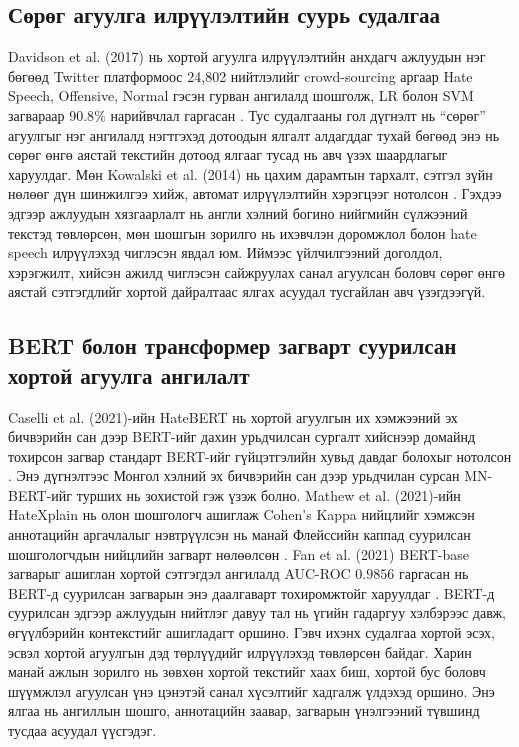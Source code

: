 \subsection{Сөрөг агуулга илрүүлэлтийн суурь судалгаа}

Davidson et al. (2017) нь хортой агуулга илрүүлэлтийн анхдагч ажлуудын нэг
бөгөөд Twitter платформоос 24,802 нийтлэлийг crowd-sourcing аргаар Hate Speech,
Offensive, Normal гэсэн гурван ангилалд шошголж, LR болон SVM загвараар
$90.8\%$ нарийвчлал гаргасан \cite{davidson2017}. Тус судалгааны гол дүгнэлт нь
``сөрөг'' агуулгыг нэг ангилалд нэгтгэхэд дотоодын ялгалт алдагддаг тухай
бөгөөд энэ нь сөрөг өнгө аястай текстийн дотоод ялгааг тусад нь авч үзэх
шаардлагыг харуулдаг.
Мөн Kowalski et al. (2014) нь цахим дарамтын тархалт, сэтгэл зүйн нөлөөг
дүн шинжилгээ хийж, автомат илрүүлэлтийн хэрэгцээг нотолсон \cite{kowalski2014}.
Гэхдээ эдгээр ажлуудын хязгаарлалт нь англи хэлний богино нийгмийн сүлжээний
текстэд төвлөрсөн, мөн шошгын зорилго нь ихэвчлэн доромжлол болон hate speech
илрүүлэхэд чиглэсэн явдал юм. Иймээс үйлчилгээний доголдол, хэрэгжилт, хийсэн
ажилд чиглэсэн сайжруулах санал агуулсан боловч сөрөг өнгө аястай сэтгэгдлийг
хортой дайралтаас ялгах асуудал тусгайлан авч үзэгдээгүй.

\subsection{BERT болон трансформер загварт суурилсан хортой агуулга ангилалт}

Caselli et al. (2021)-ийн HateBERT нь хортой агуулгын их хэмжээний эх бичвэрийн сан дээр BERT-ийг дахин
урьдчилсан сургалт хийснээр домайнд тохирсон загвар стандарт BERT-ийг
гүйцэтгэлийн хувьд давдаг болохыг нотолсон \cite{caselli2021}. Энэ дүгнэлтээс
Монгол хэлний эх бичвэрийн сан дээр урьдчилан сурсан MN-BERT-ийг турших нь зохистой гэж үзэж
болно.
Mathew et al. (2021)-ийн HateXplain нь олон шошгологч ашиглаж Cohen's
Kappa нийцлийг хэмжсэн аннотацийн аргачлалыг нэвтрүүлсэн нь манай Флейссийн
каппад суурилсан шошгологчдын нийцлийн загварт нөлөөлсөн \cite{mathew2021}.
Fan et al. (2021) BERT-base загварыг ашиглан хортой сэтгэгдэл ангилалд
AUC-ROC $0.9856$ гаргасан нь BERT-д суурилсан загварын энэ даалгаварт
тохиромжтойг харуулдаг \cite{fan2021toxic}.
BERT-д суурилсан эдгээр ажлуудын нийтлэг давуу тал нь үгийн гадаргуу хэлбэрээс
давж, өгүүлбэрийн контекстийг ашигладагт оршино. Гэвч ихэнх судалгаа хортой
эсэх, эсвэл хортой агуулгын дэд төрлүүдийг илрүүлэхэд төвлөрсөн байдаг. Харин
манай ажлын зорилго нь зөвхөн хортой текстийг хаах биш, хортой бус боловч
шүүмжлэл агуулсан үнэ цэнэтэй санал хүсэлтийг хадгалж үлдэхэд оршино. Энэ
ялгаа нь ангиллын шошго, аннотацийн заавар, загварын үнэлгээний түвшинд тусдаа
асуудал үүсгэдэг.

